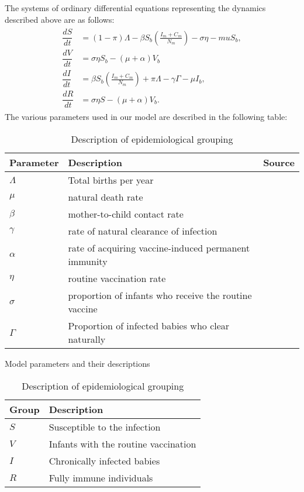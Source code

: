 The systems of ordinary differential equations representing the dynamics described above are as follows:
\begin{align}
\begin{split}
\dfrac{dS}{dt}&=(1-\pi)\Lambda -\beta S_b\left(\frac{I_m+C_m}{N_m}\right)-\sigma\eta-muS_b,\\
\dfrac{dV}{dt}&=\sigma\eta S_b-(\mu+\alpha) V_b\\
\dfrac{dI}{dt}&=\beta S_b\left(\frac{I_m+C_m}{N_m}\right) + \pi\Lambda-\gamma\Gamma-\mu I_b,\\
\dfrac{dR}{dt}&=\sigma\eta S - (\mu +\alpha) V_b.
\end{split}
\end{align}
The various parameters used in our model are described in the following table:

\vspace{1cm}
\begin{table}[h]
	\centering
	\begin{tabular}{ |p{1.57cm}|p{10cm}|p{2cm}| }
		\hline
		Parameter& Description &    Source \\
		\hline
		$\Lambda$    		& 	Total births per year  					&																																								\\
		$	\mu $					&  	natural death rate   &																																									\\
		$\beta$ 					& 	mother-to-child contact rate &																																			\\
		$\gamma$ 			& 	rate of natural clearance of infection										&																							\\
		$\alpha$ 				& 	rate of acquiring vaccine-induced permanent immunity	&																								\\
		$\eta  $					& routine vaccination rate																&																								\\
		$\sigma$ 				& 	proportion of infants who receive the routine vaccine &																							\\
		$\Gamma$			& 	Proportion of infected babies who clear naturally		&																						\\
		\hline
	\end{tabular}
	\caption{Model parameters and their descriptions}
	\label{table:1}
	
	
		\centering
		\begin{tabular}{ |p{1.57cm}|p{12cm}| }
			\hline
			Group & Description \\
			\hline
			$	S		$    		& 		Susceptible to the infection    \\
			$	V 		$			&  	 	Infants with the routine vaccination	\\
			$	I 		$			&  	 	Chronically infected babies   		\\
			$	R		$ 			& 		Fully immune individuals		\\
			\hline
		\end{tabular}
		\caption{Description of epidemiological grouping}
		\label{table:2}
		\vspace{1mm}
\end{table}
